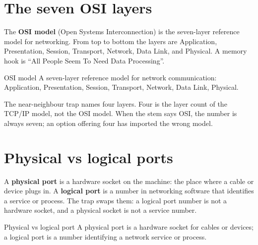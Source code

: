 \section{The seven OSI layers}
The \textbf{OSI model} (Open Systems Interconnection) is the seven-layer
reference model for networking. From top to bottom the layers are
Application, Presentation, Session, Transport, Network, Data Link, and
Physical. A memory hook is ``All People Seem To Need Data Processing''.

\begin{definitionbox}{OSI model}
A seven-layer reference model for network communication: Application,
Presentation, Session, Transport, Network, Data Link, Physical.
\end{definitionbox}

The near-neighbour trap names four layers. Four is the layer count of the
TCP/IP model, not the OSI model. When the stem says OSI, the number is
always seven; an option offering four has imported the wrong model.

\section{Physical vs logical ports}
A \textbf{physical port} is a hardware socket on the machine: the place where
a cable or device plugs in. A \textbf{logical port} is a number in networking
software that identifies a service or process. The trap swaps them: a logical
port number is not a hardware socket, and a physical socket is not a service
number.

\begin{definitionbox}{Physical vs logical port}
A physical port is a hardware socket for cables or devices; a logical port is
a number identifying a network service or process.
\end{definitionbox}

